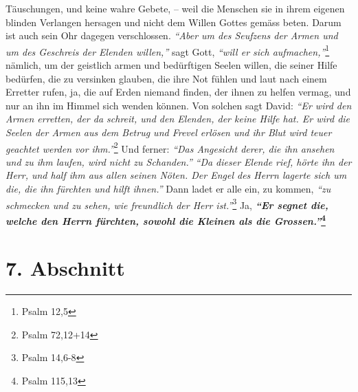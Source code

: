 Täuschungen, und keine wahre Gebete, -- weil die Menschen sie in ihrem eigenen
blinden Verlangen hersagen und nicht dem Willen Gottes 
gemäss beten. Darum ist
auch sein Ohr dagegen verschlossen.
\textit{"`Aber um des Seufzens der Armen und um des Geschreis der Elenden
willen,"'}
sagt Gott,
\textit{"`will er sich aufmachen,"'}\footnote{Psalm 12,5}
nämlich, um der geistlich armen und bedürftigen
Seelen willen, die seiner Hilfe bedürfen, die zu versinken glauben, die ihre
Not fühlen und laut nach einem Erretter rufen, ja, die auf Erden niemand
finden, der ihnen zu helfen vermag, und nur an ihn im Himmel sich wenden
können. Von solchen sagt David:
\textit{"`Er wird den Armen erretten, der da schreit,
und den Elenden, der keine Hilfe hat. Er wird die Seelen der Armen aus dem
Betrug und Frevel erlösen und ihr Blut wird teuer geachtet werden vor
ihm."'}\footnote{Psalm 72,12+14}
Und ferner:
\textit{"`Das Angesicht derer, die ihn ansehen und zu ihm laufen, wird nicht zu
Schanden."'}
\textit{"`Da dieser Elende rief, hörte ihn der Herr, und half ihm aus allen
seinen Nöten. Der Engel des Herrn lagerte sich um die, die ihn fürchten und
hilft ihnen."'}
Dann ladet er alle ein, zu kommen,
\textit{"`zu schmecken und zu sehen, wie freundlich der Herr
ist."'}\footnote{Psalm 14,6-8}
Ja, \textbf{\textit{"`Er segnet die, welche den Herrn fürchten,
sowohl die Kleinen als
die Grossen."'}\footnote{Psalm 115,13}}

\section{7. Abschnitt} \label{kap6_ab7}

